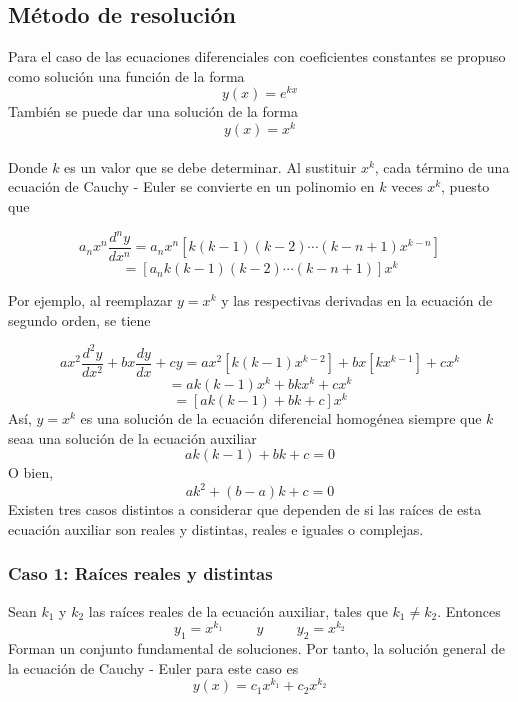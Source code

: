 \documentclass[12pt,letterpaper]{article}
\begin{document}
\begin{flushleft}
\subsection{{\large  Método de resolución}}
\end{flushleft}
Para el caso de las ecuaciones diferenciales con coeficientes constantes se propuso como solución una función de la forma
$$y(x)=e^{kx}$$
También se puede dar una solución de la forma\\
$$y(x)=x^{k}$$\\
Donde $k$ es un valor que se debe determinar. Al sustituir $x^{k}$, cada término de una ecuación de Cauchy - Euler se convierte en un polinomio en $k$ veces $x^{k}$, puesto que

$$a_{n}x^{n}\frac{d^{n}y}{dx^{n}}=a_{n}x^{n}[k(k-1)(k-2)\cdots(k-n+1)x^{k-n}]$$
$$=[a_{n}k(k-1)(k-2)\cdots(k-n+1)]x^{k}$$

\begin{flushleft}
Por ejemplo, al reemplazar $y=x^{k}$ y las respectivas derivadas en la ecuación de segundo orden, se tiene\\
\end{flushleft}

$$ax^{2}\frac{d^{2}y}{dx^{2}}+bx\frac{dy}{dx}+cy  =ax^{2}[k(k-1)x^{k-2}]+bx[kx^{k-1}]+cx^{k}$$
$$=ak(k-1)x^{k}+bkx^{k}+cx^{k}$$
$$=[ak(k-1)+bk+c]x^{k}$$
Así, $y=x^{k}$ es una solución de la ecuación diferencial homogénea siempre que $k$ seaa una solución de la ecuación auxiliar
$$ak(k-1)+bk+c=0$$
O bien,
$$ak^{2}+(b-a)k+c=0$$
Existen tres casos distintos a considerar que dependen de si las raíces de esta ecuación auxiliar son reales y distintas, reales e iguales o complejas.\\

\begin{flushleft}
\subsubsection{{\large Caso 1: Raíces reales y distintas}}
\end{flushleft}
Sean $k_{1}$ y $k_{2}$ las raíces reales de la ecuación auxiliar, tales que $k_{1}\neq k_{2}$. Entonces\\
$$y_{1}=x^{k_{1}}\hspace{1cm}y\hspace{1cm}y_{2}=x^{k_{2}}$$
Forman un conjunto fundamental de soluciones. Por tanto, la solución general de la ecuación de Cauchy - Euler para este caso es
$$y(x)=c_{1}x^{k_{1}}+c_{2}x^{k_{2}}$$
\end{document}
